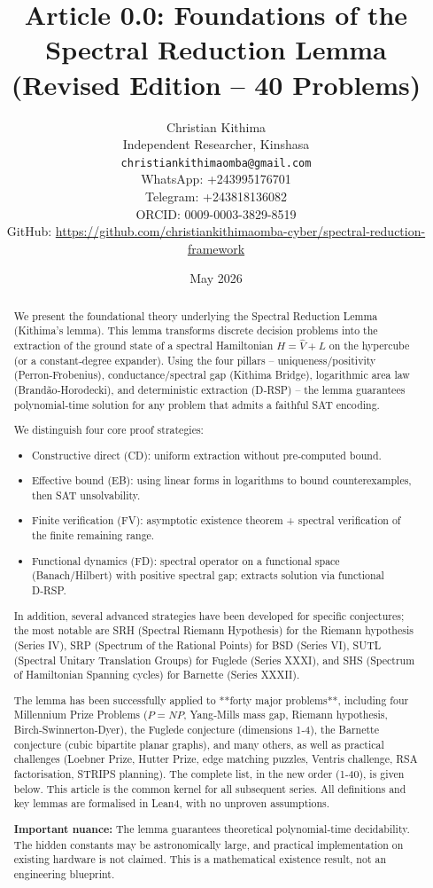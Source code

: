 \documentclass[11pt,a4paper]{article}
\title{Article 0.0: Foundations of the Spectral Reduction Lemma (Revised Edition – 40 Problems)}
\author{Christian Kithima \\
Independent Researcher, Kinshasa \\
\texttt{christiankithimaomba@gmail.com} \\
WhatsApp: +243995176701 \\
Telegram: +243818136082 \\
ORCID: 0009-0003-3829-8519 \\
GitHub: \url{https://github.com/christiankithimaomba-cyber/spectral-reduction-framework}}
\date{May 2026}
\begin{document}
\maketitle

\begin{abstract}
We present the foundational theory underlying the Spectral Reduction Lemma (Kithima's lemma). This lemma transforms discrete decision problems into the extraction of the ground state of a spectral Hamiltonian \(H = \hat{V} + L\) on the hypercube (or a constant‑degree expander). Using the four pillars – uniqueness/positivity (Perron‑Frobenius), conductance/spectral gap (Kithima Bridge), logarithmic area law (Brandão‑Horodecki), and deterministic extraction (D‑RSP) – the lemma guarantees polynomial‑time solution for any problem that admits a faithful SAT encoding.

We distinguish four core proof strategies:
\begin{itemize}
\item Constructive direct (CD): uniform extraction without pre‑computed bound.
\item Effective bound (EB): using linear forms in logarithms to bound counterexamples, then SAT unsolvability.
\item Finite verification (FV): asymptotic existence theorem + spectral verification of the finite remaining range.
\item Functional dynamics (FD): spectral operator on a functional space (Banach/Hilbert) with positive spectral gap; extracts solution via functional D‑RSP.
\end{itemize}

In addition, several advanced strategies have been developed for specific conjectures; the most notable are SRH (Spectral Riemann Hypothesis) for the Riemann hypothesis (Series IV), SRP (Spectrum of the Rational Points) for BSD (Series VI), SUTL (Spectral Unitary Translation Groups) for Fuglede (Series XXXI), and SHS (Spectrum of Hamiltonian Spanning cycles) for Barnette (Series XXXII).

The lemma has been successfully applied to **forty major problems**, including four Millennium Prize Problems (\(P = NP\), Yang‑Mills mass gap, Riemann hypothesis, Birch‑Swinnerton‑Dyer), the Fuglede conjecture (dimensions 1‑4), the Barnette conjecture (cubic bipartite planar graphs), and many others, as well as practical challenges (Loebner Prize, Hutter Prize, edge matching puzzles, Ventris challenge, RSA factorisation, STRIPS planning). The complete list, in the new order (1‑40), is given below. This article is the common kernel for all subsequent series. All definitions and key lemmas are formalised in Lean4, with no unproven assumptions.

\textbf{Important nuance:} The lemma guarantees theoretical polynomial‑time decidability. The hidden constants may be astronomically large, and practical implementation on existing hardware is not claimed. This is a mathematical existence result, not an engineering blueprint.
\end{abstract}
\end{document}

